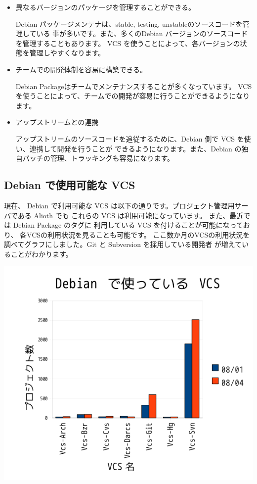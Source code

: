 \documentclass[mingoth,a4paper]{jsarticle}
\begin{document}
\begin{itemize}
  \item 異なるバージョンのパッケージを管理することができる。
    
    Debian パッケージメンテナは、stable, testing, unstableのソースコードを管理している
    事が多いです。また、多くのDebian バージョンのソースコードを管理することもあります。
    VCS を使うことによって、各バージョンの状態を管理しやすくなります。

  \item チームでの開発体制を容易に構築できる。

    Debian Packageはチームでメンテナンスすることが多くなっています。
    VCS を使うことによって、チームでの開発が容易に行うことができるようになります。

  \item アップストリームとの連携

    アップストリームのソースコードを追従するために、Debian 側で VCS を使い、連携して開発を行うことが
    できるようになります。また、Debian の独自パッチの管理、トラッキングも容易になります。
\end{itemize}


\subsection{Debian で使用可能な VCS}

現在、 Debian で利用可能な VCS は以下の通りです。プロジェクト管理用サーバである Alioth でも
これらの VCS は利用可能になっています。
また、最近では Debian Package のタグに 利用している VCS を付けることが可能になっており、
各VCSの利用状況を見ることも可能です。 
ここ数か月のVCSの利用状況を調べてグラフにしました。Git と Subversion を採用している開発者
が増えていることがわかります。
\begin{center}
\includegraphics[width=0.5\hsize]{image200804/debian-vcs-200804.png}
\end{center}
\end{document}
